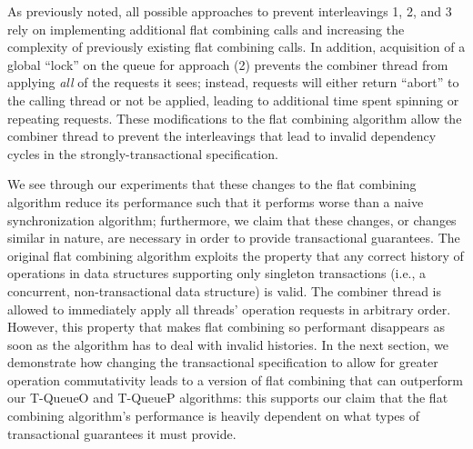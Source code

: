 As previously noted, all possible approaches to prevent interleavings 1, 2, and 3 rely on implementing additional flat combining calls and increasing the complexity of previously existing flat combining calls. In addition, acquisition of a global ``lock'' on the queue for approach (2) prevents the combiner thread from applying \emph{all} of the requests it sees; instead, requests will either return ``abort'' to the calling thread or not be applied, leading to additional time spent spinning or repeating requests. These modifications to the flat combining algorithm allow the combiner thread to prevent the interleavings that lead to invalid dependency cycles in the strongly-transactional specification.

We see through our experiments that these changes to the flat combining algorithm reduce its performance such that it performs worse than a naive synchronization algorithm; furthermore, we claim that these changes, or changes similar in nature, are necessary in order to provide transactional guarantees. The original flat combining algorithm exploits the property that any correct history of operations in data structures supporting only singleton transactions (i.e., a concurrent, non-transactional data structure) is valid. The combiner thread is allowed to immediately apply all threads' operation requests in arbitrary order. However, this property that makes flat combining so performant disappears as soon as the algorithm has to deal with invalid histories. In the next section, we demonstrate how changing the transactional specification to allow for greater operation commutativity leads to a version of flat combining that can outperform our T-QueueO and T-QueueP algorithms: this supports our claim that the flat combining algorithm's performance is heavily dependent on what types of transactional guarantees it must provide.
